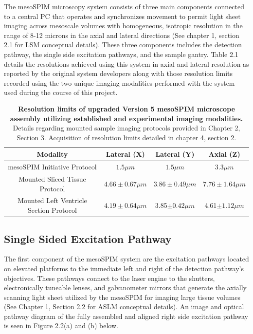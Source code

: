 The mesoSPIM microscopy system consists of three main components connected to a central PC that operates and synchronizes movement to permit light sheet imaging across mesoscale volumes with homogeneous, isotropic resolution in the range of 8-12 microns in the axial and lateral directions (See chapter 1, section 2.1 for LSM conceptual details). These three components includes the detection pathway, the single side excitation pathways, and the sample gantry. Table 2.1 details the resolutions achieved using this system in axial and lateral resolution as reported by the original system developers along with those resolution limits recorded  using the two unique imaging modalities performed with the system used during the course of this project.


\begin{table}[H]
    
    \begin{tabular}{|c|c|c|c|}
        \hline
         \textbf{Modality} &\textbf{ Lateral (X)} & \textbf{Lateral (Y)} & \textbf{Axial (Z)}\\\hline
         
         mesoSPIM Initiative Protocol \cite{voigt_mesospim_2019} & $1.5 \mu m $ & $1.5 \mu m$  & $3.3 \mu m$ \\
         
         Mounted Sliced Tissue Protocol & $4.66\pm0.67\mu m$ & $3.86\pm0.49\mu m$ & $7.76\pm1.64\mu m$\\
        
         Mounted Left Ventricle Section Protocol & $4.19\pm0.64\mu m $& 3.85$\pm0.42\mu m$ & 4.61$\pm1.12\mu m$\\\hline
       
    \end{tabular}
    \medskip
    \caption{\textbf{Resolution limits of upgraded Version 5 mesoSPIM microscope assembly utilizing established and experimental imaging modalities.} Details regarding mounted sample imaging protocols provided in Chapter 2, Section 3. Acquisition of resolution limits detailed in chapter 4, section 2.}
\end{table}

 


\subsection{Single Sided Excitation Pathway}
The first component of the mesoSPIM system are the excitation pathways located on elevated platforms to the immediate left and right of the detection pathway’s objectives. These pathways connect to the laser engine to the shutters, electronically tuneable lenses, and galvanometer mirrors that generate the axially scanning light sheet utilized by the mesoSPIM for imaging large tissue volumes (See Chapter 1, Section 2.2 for ASLM conceptual details). An image and optical pathway diagram of the fully assembled and aligned right side excitation pathway is seen in Figure 2.2(a) and (b) below.

